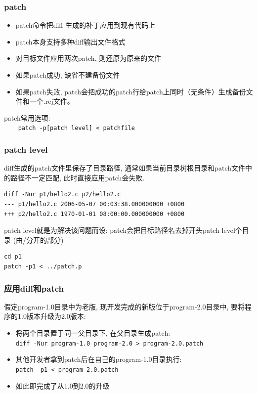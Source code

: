 \documentclass[compress]{beamer}
\begin{document}
\begin{frame}[containsverbatim]
\frametitle{patch}
\begin{itemize}
\item \alert{patch}命令把\alert{diff} 生成的补丁应用到现有代码上

\item \alert{patch}本身支持多种\alert{diff}输出文件格式

\item 对目标文件应用两次\alert{patch}, 则还原为原来的文件

\item 如果patch成功, 缺省不建备份文件

\item 如果patch失败, \alert{patch}会把成功的patch行给patch上同时（无条件）生成备份文件和一个.rej文件。
\end{itemize}

\alert{patch}常用选项: \\
\verb~    patch -p[patch level] < patchfile ~

\end{frame}

\begin{frame}[containsverbatim]
\frametitle{patch level}

\alert{diff}生成的patch文件里保存了目录路径, 通常如果当前目录树根目录和patch文件中的路径不一定匹配,
此时直接应用patch会失败.\\[1ex]
{\small
\begin{Verbatim}
diff -Nur p1/hello2.c p2/hello2.c
--- p1/hello2.c 2006-05-07 00:03:38.000000000 +0800
+++ p2/hello2.c 1970-01-01 08:00:00.000000000 +0800
\end{Verbatim}
}

patch level就是为解决该问题而设: patch会把目标路径名去掉开头patch level个目录
(由/分开的部分)
\begin{Verbatim}
cd p1
patch -p1 < ../patch.p
\end{Verbatim}

\end{frame}

\begin{frame}[containsverbatim]
\frametitle{应用diff和patch}

假定program-1.0目录中为老版, 现开发完成的新版位于program-2.0目录中, 
要将程序的1.0版本升级为2.0版本:
\begin{itemize}
\item 将两个目录置于同一父目录下, 在父目录生成patch: \\
  {\small \verb~diff -Nur program-1.0 program-2.0 > program-2.0.patch~ }
\item 其他开发者拿到patch后在自己的program-1.0目录执行:\\
\verb~patch -p1 < program-2.0.patch~
\item 如此即完成了从1.0到2.0的升级
\end{itemize}

\end{frame}
\end{document}
